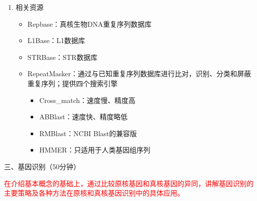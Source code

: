 \documentclass{TIJMUjiaoanLL}
\begin{document}
\begin{enumerate}
  \item 相关资源
    \begin{itemize}
      \item Repbase：真核生物DNA重复序列数据库
      \item L1Base：L1数据库
      \item STRBase：STR数据库
      \item RepeatMasker：通过与已知重复序列数据库进行比对，识别、分类和屏蔽重复序列；提供四个搜索引擎
	\begin{itemize}
	  \item Cross\_match：速度慢、精度高
	  \item ABBlast：速度快、精度略低
	  \item RMBlast：NCBI Blast的兼容版
	  \item HMMER：只适用于人类基因组序列
	\end{itemize}
    \end{itemize}
\end{enumerate}


\otherTail
\newpage
\otherHeader


\noindent
三、基因识别（50分钟）

\textcolor{red}{在介绍基本概念的基础上，通过比较原核基因和真核基因的异同，讲解基因识别的主要策略及各种方法在原核和真核基因识别中的具体应用。}
\end{document}
